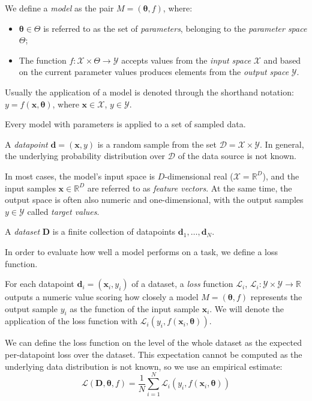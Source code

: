 \begin{definition}
We define a \emph{model} as the pair $M = (\pmb{\theta}, f)$, where:
\begin{itemize}
\item $\pmb{\theta} \in \Theta$ is referred to as the set of \emph{parameters}, belonging to the \emph{parameter space} $\Theta$;
\item The function $f: \mathcal{X} \times \Theta \to \mathcal{Y}$ accepts values from the \emph{input space} $\mathcal{X}$ and based on the current parameter values produces elements from the \emph{output space} $\mathcal{Y}$.
\end{itemize}
Usually the application of a model is denoted through the shorthand notation:\\ $y = f(\pmb{x}, \pmb{\theta})$, where $\pmb{x} \in \mathcal{X}$, $y \in \mathcal{Y}$.
\end{definition}

Every model with parameters is applied to a set of sampled data.

\begin{definition}
A \emph{datapoint} $\pmb{d}=(\pmb{x}, y)$ is a random sample from the set $\mathcal{D} = \mathcal{X} \times \mathcal{Y}$. In general, the underlying probability distribution over $\mathcal{D}$ of the data source is not known. 

In most cases, the model's input space is $D$-dimensional real ($\mathcal{X}=\mathbb{R}^D$), and the input samples $\pmb{x} \in \mathbb{R}^D$ are referred to as \emph{feature vectors}. At the same time, the output space is often also numeric and one-dimensional, with the output samples $y \in \mathcal{Y}$ called \emph{target values}.  

A \emph{dataset} $\pmb{D}$ is a finite collection of datapoints $\pmb{d}_1,\dots,\pmb{d}_N$.
\end{definition}

In order to evaluate how well a model performs on a task, we define a loss function.

\begin{definition}
For each datapoint $\pmb{d}_i=(\pmb{x}_i, y_i)$ of a dataset, a \emph{loss} function $\mathcal{L}_{i}$, $\mathcal{L}_{i}: \mathcal{Y} \times \mathcal{Y} \to \mathbb{R} $ outputs a numeric value scoring how closely a model $M = (\pmb{\theta}, f)$ represents the output sample $y_i$ as the function of the input sample $\pmb{x}_i$. We will denote the application of the loss function with $\mathcal{L}_{i}(y_i, f(\pmb{x}_i, \pmb{\theta}))$.

We can define the loss function on the level of the whole dataset as the expected per-datapoint loss over the dataset. This expectation cannot be computed as the underlying data distribution is not known, so we use an empirical estimate: \begin{equation}
\mathcal{L}(\pmb{D}, \pmb{\theta}, f) = \frac{1}{N}\sum_{i=1}^{N}{\mathcal{L}_{i}(y_i, f(\pmb{x}_i, \pmb{\theta}))}
\end{equation}
\end{definition}

